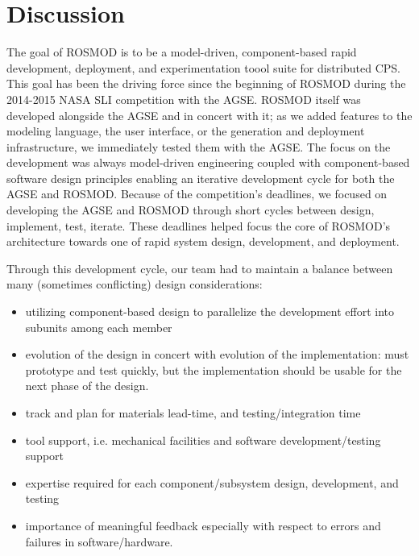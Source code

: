 
\section{Discussion}



The goal of ROSMOD is to be a model-driven, component-based rapid
development, deployment, and experimentation toool suite for
distributed CPS.  This goal has been the driving force since the
beginning of ROSMOD during the 2014-2015 NASA SLI competition with the
AGSE.  ROSMOD itself was developed alongside the AGSE and in concert
with it; as we added features to the modeling language, the user
interface, or the generation and deployment infrastructure, we
immediately tested them with the AGSE.  The focus on the development
was always model-driven engineering coupled with component-based
software design principles enabling an iterative development cycle for
both the AGSE and ROSMOD.  Because of the competition's deadlines, we
focused on developing the AGSE and ROSMOD through short cycles between
design, implement, test, iterate.  These deadlines helped focus the
core of ROSMOD's architecture towards one of rapid system design,
development, and deployment.

Through this development cycle, our team had to maintain a balance
between many (sometimes conflicting) design considerations:

\begin{itemize}
\item utilizing component-based design to parallelize the development
  effort into subunits among each member
\item evolution of the design in concert with evolution of the
  implementation: must prototype and test quickly, but the
  implementation should be usable for the next phase of the design.
\item track and plan for materials lead-time, and testing/integration time
\item tool support, i.e. mechanical facilities and software
  development/testing support
\item expertise required for each component/subsystem design,
  development, and testing
\item importance of meaningful feedback especially with respect to
  errors and failures in software/hardware.
\end{itemize}

